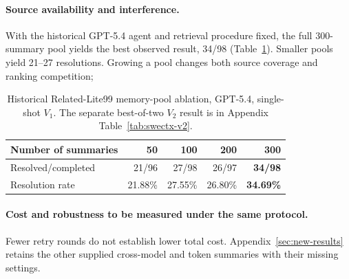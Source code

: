 \paragraph{Source availability and interference.}
With the historical GPT-5.4 agent and retrieval procedure fixed, the full
300-summary pool yields the best observed result, 34/98
(Table~\ref{tab:swectx-poolsize}). Smaller pools yield 21--27 resolutions.
Growing a pool changes both source coverage and ranking competition;

\begin{table}[!b]
\centering
\caption{Historical Related-Lite99 memory-pool ablation, GPT-5.4, single-shot
$V_1$. The separate best-of-two $V_2$ result is in Appendix Table~\ref{tab:swectx-v2}.}
\label{tab:swectx-poolsize}
\begin{tabular}{lrrrr}
\toprule
Number of summaries & 50 & 100 & 200 & 300 \\
\midrule
Resolved/completed & 21/96 & 27/98 & 26/97 & \textbf{34/98} \\
Resolution rate & 21.88\% & 27.55\% & 26.80\% & \textbf{34.69\%} \\
\bottomrule
\end{tabular}
\end{table}

\paragraph{Cost and robustness to be measured under the same protocol.}
Fewer retry rounds do not establish lower total cost.  Appendix~\ref{sec:new-results} retains
the other supplied cross-model and token summaries with their missing settings.
